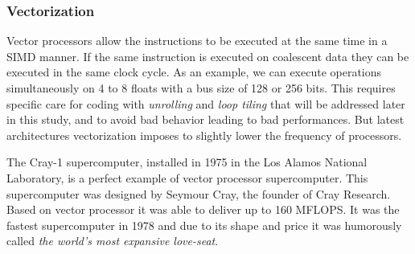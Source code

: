 \subsubsection{Vectorization} 
Vector processors allow the instructions to be executed at the same time in a SIMD manner. 
If the same instruction is executed on coalescent data they can be executed in the same clock cycle. 
As an example, we can execute operations simultaneously on 4 to 8 floats with a bus size of 128 or 256 bits.
This requires specific care for coding with \textit{unrolling} and \textit{loop tiling} that will be addressed later in this study, and to avoid bad behavior leading to bad performances.
But latest architectures vectorization imposes to slightly lower the frequency of processors. 

The Cray-1 supercomputer\cite{russell1978cray}, installed in 1975 in the Los Alamos National Laboratory, is a perfect example of vector processor supercomputer.
This supercomputer was designed by Seymour Cray, the founder of Cray Research.
Based on vector processor it was able to deliver up to 160 MFLOPS.
It was the fastest supercomputer in 1978 and due to its shape and price it was humorously called \textit{the world's most expansive love-seat}. 

